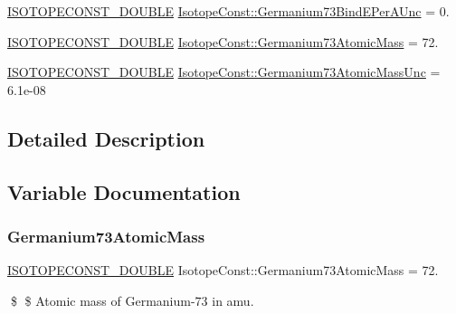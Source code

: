 \begin{DoxyCompactItemize}
\mbox{\hyperlink{group___isotope_const-_macros_ga8f45a7272ce02c0b4c65c44636ed719a}{I\+S\+O\+T\+O\+P\+E\+C\+O\+N\+S\+T\+\_\+\+D\+O\+U\+B\+LE}} \mbox{\hyperlink{group___isotope_const-_germanium-_ge73_ga6bf2b4d1d06912e83b25bd2f7ab87a78}{Isotope\+Const\+::\+Germanium73\+Bind\+E\+Per\+A\+Unc}} = 0.
\item 
\mbox{\hyperlink{group___isotope_const-_macros_ga8f45a7272ce02c0b4c65c44636ed719a}{I\+S\+O\+T\+O\+P\+E\+C\+O\+N\+S\+T\+\_\+\+D\+O\+U\+B\+LE}} \mbox{\hyperlink{group___isotope_const-_germanium-_ge73_ga753f70b0ead597625798a7aa5857b518}{Isotope\+Const\+::\+Germanium73\+Atomic\+Mass}} = 72.
\item 
\mbox{\hyperlink{group___isotope_const-_macros_ga8f45a7272ce02c0b4c65c44636ed719a}{I\+S\+O\+T\+O\+P\+E\+C\+O\+N\+S\+T\+\_\+\+D\+O\+U\+B\+LE}} \mbox{\hyperlink{group___isotope_const-_germanium-_ge73_gab6f57f7dda73a8be6d8075449504f870}{Isotope\+Const\+::\+Germanium73\+Atomic\+Mass\+Unc}} = 6.\+1e-\/08
\end{DoxyCompactItemize}


\subsection{Detailed Description}


\subsection{Variable Documentation}
\mbox{\label{group___isotope_const-_germanium-_ge73_ga753f70b0ead597625798a7aa5857b518}} 
\subsubsection{\texorpdfstring{Germanium73\+Atomic\+Mass}{Germanium73AtomicMass}}
{\footnotesize\ttfamily \mbox{\hyperlink{group___isotope_const-_macros_ga8f45a7272ce02c0b4c65c44636ed719a}{I\+S\+O\+T\+O\+P\+E\+C\+O\+N\+S\+T\+\_\+\+D\+O\+U\+B\+LE}} Isotope\+Const\+::\+Germanium73\+Atomic\+Mass = 72.}

\$ \$ Atomic mass of Germanium-\/73 in amu. \mbox{\label{group___isotope_const-_germanium-_ge73_gab6f57f7dda73a8be6d8075449504f870}} 
